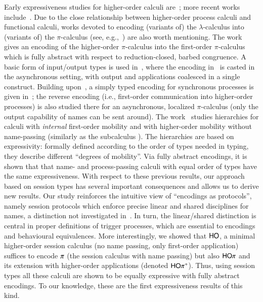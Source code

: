 Early expressiveness studies for higher-order calculi are~\cite{Tho90,San923}; 
more recent works include~\cite{BundgaardHG06,DBLP:conf/icalp/LanesePSS10,DBLP:journals/iandc/LanesePSS11,XuActa2012,DBLP:conf/wsfm/XuYL13}.
Due to the close relationship between higher-order process calculi and functional calculi, 
works devoted to encoding (variants of) the $\lambda$-calculus into (variants of) the $\pi$-calculus (see, e.g.,~\cite{San92,DBLP:journals/tcs/Fu99,DBLP:journals/iandc/YoshidaBH04,BHY,DBLP:conf/concur/SangiorgiX14}) are also worth mentioning.
The work~\cite{San923} gives an encoding of the higher-order $\pi$-calculus
into the first-order $\pi$-calculus which is fully abstract with respect to reduction-closed, barbed congruence. 
A basic form of input/output types is used in~\cite{DBLP:journals/tcs/Sangiorgi01}, where the encoding in~\cite{San923} is casted in the asynchronous setting, with output and applications coalesced in a single construct. Building upon~\cite{DBLP:journals/tcs/Sangiorgi01}, 
a simply typed encoding for synchronous processes is given in~\cite{SaWabook}; the reverse encoding (i.e.,  first-order communication into higher-order processes) is also studied there for an asynchronous, localized $\pi$-calculus (only the output capability of names can be sent around).
The work~\cite{San96int} studies hierarchies for calculi with \emph{internal} first-order mobility and 
with higher-order mobility without name-passing (similarly as the subcalculus \HO). 
The hierarchies are based on expressivity: 
formally defined according to the order of types needed in typing, 
they describe different ``degrees of mobility''.
Via fully abstract encodings, it is shown that that name- and process-passing calculi with equal order of types have the same expressiveness.
With respect to these previous results, our approach based on session types 
has several important consequences and allows us to derive new results.  Our study reinforces the intuitive view of ``encodings as protocols'', namely session protocols which enforce precise linear and shared disciplines for names, a distinction not investigated in~\cite{San923,DBLP:journals/tcs/Sangiorgi01}. 
In turn, the linear/shared distinction is central in proper definitions of trigger processes, which are essential to encodings and behavioural equivalences.
More interestingly, we showed that $\mathsf{HO}$, a  minimal higher-order session calculus (no name passing, only first-order application) suffices to encode $\pi$ (the session calculus with name passing) but also 
$\mathsf{HO}\pi$  and 
its extension  with higher-order applications (denoted $\mathsf{HO}\pi^{\mathsf +}$). 
Thus, using session types all these calculi are shown to be equally expressive with fully abstract encodings.
To our knowledge, these are the first expressiveness results of this kind.

